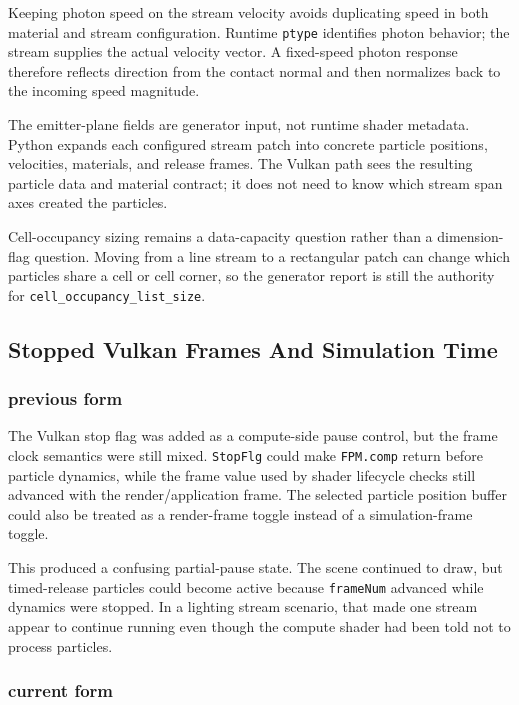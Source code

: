 Keeping photon speed on the stream velocity avoids duplicating speed in both
material and stream configuration.  Runtime \texttt{ptype} identifies photon
behavior; the stream supplies the actual velocity vector.  A fixed-speed
photon response therefore reflects direction from the contact normal and then
normalizes back to the incoming speed magnitude.

The emitter-plane fields are generator input, not runtime shader metadata.
Python expands each configured stream patch into concrete particle positions,
velocities, materials, and release frames.  The Vulkan path sees the resulting
particle data and material contract; it does not need to know which stream
span axes created the particles.

Cell-occupancy sizing remains a data-capacity question rather than a
dimension-flag question.  Moving from a line stream to a rectangular patch can
change which particles share a cell or cell corner, so the generator report is
still the authority for \texttt{cell\_occupancy\_list\_size}.

\subsection{Stopped Vulkan Frames And Simulation Time}

\subsubsection{previous form}

The Vulkan stop flag was added as a compute-side pause control, but the frame
clock semantics were still mixed.  \texttt{StopFlg} could make
\texttt{FPM.comp} return before particle dynamics, while the frame value used
by shader lifecycle checks still advanced with the render/application frame.
The selected particle position buffer could also be treated as a render-frame
toggle instead of a simulation-frame toggle.

This produced a confusing partial-pause state.  The scene continued to draw,
but timed-release particles could become active because
\texttt{frameNum} advanced while dynamics were stopped.  In a lighting stream
scenario, that made one stream appear to continue running even though the
compute shader had been told not to process particles.

\subsubsection{current form}

